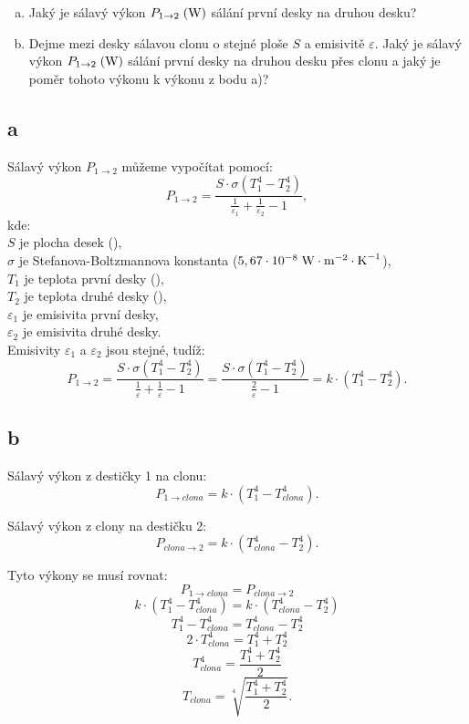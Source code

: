 \documentclass{article}
\begin{document}
\begin{enumerate}[a)]
    \item Jaký je sálavý výkon $P_{1 \rightarrow 2} \; (\textrm{W})$ sálání první desky na druhou desku?
    \item Dejme mezi desky sálavou clonu o stejné ploše $S$ a emisivitě $\varepsilon$. Jaký je sálavý výkon $P_{1 \rightarrow 2} \; (\textrm{W})$ sálání první desky na druhou desku přes clonu a jaký je poměr tohoto výkonu k výkonu z bodu a)?
\end{enumerate}


\subsection{a}
Sálavý výkon $P_{1 \rightarrow 2}$ můžeme vypočítat pomocí:
$$
    P_{1 \rightarrow 2} = \frac{S \cdot \sigma \left( T_1^4 - T_2^4 \right)}{\frac{1}{\varepsilon_1} + \frac{1}{\varepsilon_2} - 1},
$$
kde:\\
$S$ je plocha desek (\ueqMsq),\\
$\sigma$ je Stefanova-Boltzmannova konstanta ($5,67 \cdot 10^{-8} \; \textrm{W} \cdot \textrm{m}^{-2} \cdot \textrm{K}^{-1}$),\\
$T_1$ je teplota první desky (\uK),\\
$T_2$ je teplota druhé desky (\uK),\\
$\varepsilon_1$ je emisivita první desky,\\
$\varepsilon_2$ je emisivita druhé desky.\\

Emisivity $\varepsilon_1$ a $\varepsilon_2$ jsou stejné, tudíž:
$$
    P_{1 \rightarrow 2} = \frac{S \cdot \sigma \left( T_1^4 - T_2^4 \right)}{\frac{1}{\varepsilon} + \frac{1}{\varepsilon} - 1} = \frac{S \cdot \sigma \left( T_1^4 - T_2^4 \right)}{\frac{2}{\varepsilon} - 1} = k \cdot \left( T_1^4 - T_2^4 \right).
$$


\subsection{b}
Sálavý výkon z destičky 1 na clonu:
$$
    P_{1 \rightarrow clona} = k \cdot \left( T_1^4 - T_{clona}^4 \right).
$$

Sálavý výkon z clony na destičku 2:
$$
    P_{clona \rightarrow 2} = k \cdot \left( T_{clona}^4 - T_2^4 \right).
$$

Tyto výkony se musí rovnat:
$$
    P_{1 \rightarrow clona} = P_{clona \rightarrow 2}
$$
$$
    k \cdot \left( T_1^4 - T_{clona}^4 \right) = k \cdot \left( T_{clona}^4 - T_2^4 \right)
$$
$$
    T_1^4 - T_{clona}^4 = T_{clona}^4 - T_2^4
$$
$$
    2 \cdot T_{clona}^4 = T_1^4 + T_2^4
$$
$$
    T_{clona}^4 = \frac{T_1^4 + T_2^4}{2}
$$
$$
    T_{clona} = \sqrt[4]{\frac{T_1^4 + T_2^4}{2}}.
$$
\end{document}
